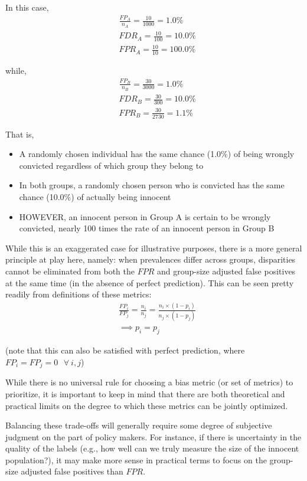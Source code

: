 \documentclass[]{krantz}
\begin{document}
In this case, \[\begin{aligned}
&\frac{FP_A}{n_A} = \frac{10}{1000} = 1.0\% \\
&FDR_A = \frac{10}{100} = 10.0\% \\
&FPR_A = \frac{10}{10} = 100.0\%\end{aligned}\]

while, \[\begin{aligned}
&\frac{FP_B}{n_B} = \frac{30}{3000} = 1.0\% \\
&FDR_B = \frac{30}{300} = 10.0\% \\
&FPR_B = \frac{30}{2730} = 1.1\%\end{aligned}\]

That is,

\begin{itemize}
\item
  A randomly chosen individual has the same chance (1.0\%) of being
  wrongly convicted regardless of which group they belong to
\item
  In both groups, a randomly chosen person who is convicted has the same
  chance (10.0\%) of actually being innocent
\item
  HOWEVER, an innocent person in Group A is certain to be wrongly
  convicted, nearly 100 times the rate of an innocent person in Group B
\end{itemize}

While this is an exaggerated case for illustrative purposes, there is a
more general principle at play here, namely: when prevalences differ
across groups, disparities cannot be eliminated from both the \(FPR\)
and group-size adjusted false positives at the same time (in the absence
of perfect prediction). This can be seen pretty readily from definitions
of these metrics: \[\begin{aligned}
    &\frac{FP_i}{FP_j} = \frac{n_i}{n_j} = \frac{n_i \times (1-p_i)}{n_j \times (1-p_j)} \\
    &\implies p_i = p_j
\end{aligned}\]

(note that this can also be satisfied with perfect prediction, where
\(FP_i = FP_j = 0~~~\forall~i,j\))

While there is no universal rule for choosing a bias metric (or set of
metrics) to prioritize, it is important to keep in mind that there are
both theoretical and practical limits on the degree to which these
metrics can be jointly optimized.

Balancing these trade-offs will generally require some degree of
subjective judgment on the part of policy makers. For instance, if there
is uncertainty in the quality of the labels (e.g., how well can we truly
measure the size of the innocent population?), it may make more sense in
practical terms to focus on the group-size adjusted false positives than
\(FPR\).
\end{document}
